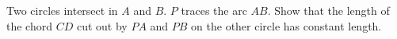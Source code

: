 Two circles intersect in $A$ and $B$. $P$ traces the arc $AB$. Show that the length of the chord $CD$ cut out by $PA$ and $PB$ on the other circle has constant length.
